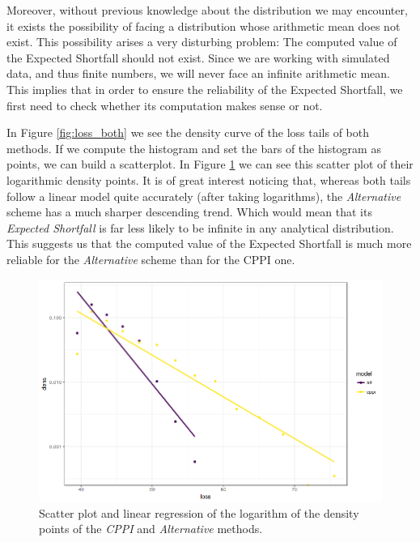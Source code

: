 Moreover, without previous knowledge about the distribution we may encounter, it exists the possibility of facing a distribution whose arithmetic mean does not exist. This possibility arises a very disturbing problem: The computed value of the Expected Shortfall should not exist. Since we are working with simulated data, and thus finite numbers, we will never face an infinite arithmetic mean. This implies that in order to ensure the reliability of the Expected Shortfall, we first need to check whether its computation makes sense or not.

In Figure \ref{fig:loss_both} we see the density curve of the loss tails of both methods. If we compute the histogram and set the bars of the histogram as points, we can build a scatterplot. 
In Figure \ref{fig:lm-tails} we can see this scatter plot of their logarithmic density points. It is of great interest noticing that, whereas both tails follow a linear model quite accurately (after taking logarithms), the \textit{Alternative} scheme has a much sharper descending trend. Which would mean that its \textit{Expected Shortfall} is far less likely to be infinite in any analytical distribution. This suggests us that the computed value of the Expected Shortfall is much more reliable for the \textit{Alternative} scheme than for the CPPI one.

\begin{figure}[h]
    \centering
    \includegraphics[scale=0.5]{images/lm_tails.png}
    \caption{Scatter plot and linear regression of the logarithm of the density points of the \textit{CPPI} and \textit{Alternative} methods.}
    \label{fig:lm-tails}
\end{figure}

